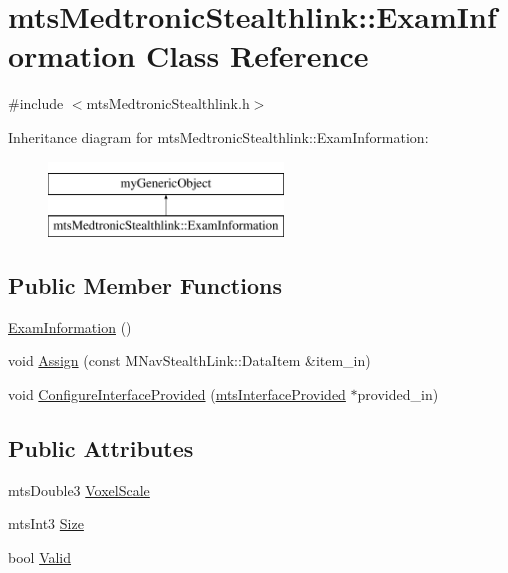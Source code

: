 \hypertarget{classmts_medtronic_stealthlink_1_1_exam_information}{\section{mts\-Medtronic\-Stealthlink\-:\-:Exam\-Information Class Reference}
\label{classmts_medtronic_stealthlink_1_1_exam_information}
}


{\ttfamily \#include $<$mts\-Medtronic\-Stealthlink.\-h$>$}

Inheritance diagram for mts\-Medtronic\-Stealthlink\-:\-:Exam\-Information\-:\begin{figure}[H]
\begin{center}
\leavevmode
\includegraphics[height=2.000000cm]{d8/d15/classmts_medtronic_stealthlink_1_1_exam_information}
\end{center}
\end{figure}
\subsection*{Public Member Functions}
\begin{DoxyCompactItemize}
\item 
\hyperlink{classmts_medtronic_stealthlink_1_1_exam_information_ac400f068b31ff7e97b8619c9a39fa509}{Exam\-Information} ()
\item 
void \hyperlink{classmts_medtronic_stealthlink_1_1_exam_information_a6fe1d1940935d92879cc0f6ba3566145}{Assign} (const M\-Nav\-Stealth\-Link\-::\-Data\-Item \&item\-\_\-in)
\item 
void \hyperlink{classmts_medtronic_stealthlink_1_1_exam_information_a48124d71b9776c4dee7637696c342029}{Configure\-Interface\-Provided} (\hyperlink{classmts_interface_provided}{mts\-Interface\-Provided} $\ast$provided\-\_\-in)
\end{DoxyCompactItemize}
\subsection*{Public Attributes}
\begin{DoxyCompactItemize}
\item 
mts\-Double3 \hyperlink{classmts_medtronic_stealthlink_1_1_exam_information_ab60d4354a0497fd3f9f9738ce9105808}{Voxel\-Scale}
\item 
mts\-Int3 \hyperlink{classmts_medtronic_stealthlink_1_1_exam_information_ac1dbe5653a197a3e7245324baca6d720}{Size}
\item 
bool \hyperlink{classmts_medtronic_stealthlink_1_1_exam_information_af540507d17d3d78b0761c07449b0a10a}{Valid}
\end{DoxyCompactItemize}
